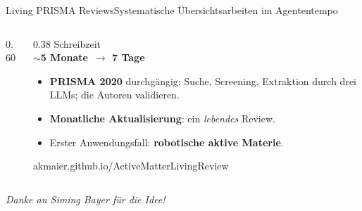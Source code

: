\documentclass[final]{beamer}
\begin{document}
\begin{frame}[t]{Living PRISMA Reviews}{Systematische Übersichtsarbeiten im Agententempo}
\begin{columns}[T]
\begin{column}{0.60\textwidth}
  \end{column}
  \begin{column}{0.38\textwidth}
    \vspace{0.4em}
    {\large Schreibzeit}\\[0.2em]
    {\fontsize{30}{32}\selectfont\bfseries\color{BaseColor} $\sim$5 Monate}
    {\fontsize{30}{32}\selectfont\bfseries\color{FAUBlue}\,$\rightarrow$ 7 Tage}\\[1.0em]
    \begin{itemize}\itemsep=0.45em\large
      \item \textbf{PRISMA 2020} durchgängig: Suche, Screening, Extraktion
            durch drei LLMs; die Autoren validieren.
      \item \textbf{Monatliche Aktualisierung}: ein \emph{lebendes} Review.
      \item Erster Anwendungsfall: \textbf{robotische aktive Materie}.
    \end{itemize}
    \vspace{0.5em}
    {\small\ttfamily akmaier.github.io/ActiveMatterLivingReview}
  \end{column}
\end{columns}
\vfill
\begin{center}
  {\large\itshape\color{FAUBlue} Danke an Siming Bayer für die Idee!}
\end{center}
\vspace{0.1em}
\end{frame}
\end{document}
